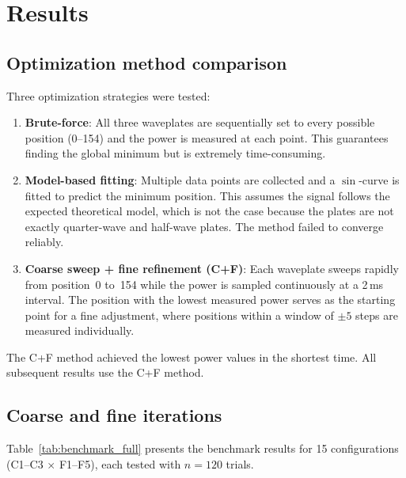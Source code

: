\section{Results}

\subsection{Optimization method comparison}

Three optimization strategies were tested:

\begin{enumerate}
    \item \textbf{Brute-force}: All three waveplates are sequentially set to every possible position (0--154) and the power is measured at each point. This guarantees finding the global minimum but is extremely time-consuming.

    \item \textbf{Model-based fitting}: Multiple data points are collected and a $\sin$-curve is fitted to predict the minimum position. This assumes the signal follows the expected theoretical model, which is not the case because the plates are not exactly quarter-wave and half-wave plates. The method failed to converge reliably.

    \item \textbf{Coarse sweep + fine refinement (C+F)}: Each waveplate sweeps rapidly from position~0 to~154 while the power is sampled continuously at a 2\,ms interval. The position with the lowest measured power serves as the starting point for a fine adjustment, where positions within a window of $\pm 5$ steps are measured individually.
\end{enumerate}

The C+F method achieved the lowest power values in the shortest time. All subsequent results use the C+F method.

\subsection{Coarse and fine iterations}
\label{sec:benchmark}

Table~\ref{tab:benchmark_full} presents the benchmark results for 15 configurations (C1--C3 $\times$ F1--F5), each tested with $n = 120$ trials.

